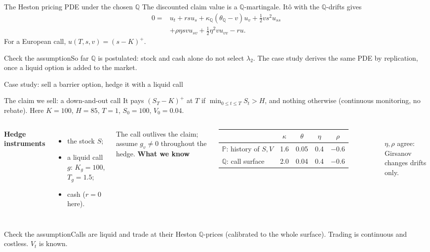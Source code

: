 \documentclass[handout,10pt,t,aspectratio=169]{beamer}
\newenvironment{watchbox}{\begin{alertblock}{Check the assumption}}{\end{alertblock}}
\newcommand{\Q}{\mathbb Q}
\newcommand{\Pp}{\mathbb P}
\begin{document}
\begin{frame}{The Heston pricing PDE under the chosen \(\Q\)}
\small
The discounted claim value is a \(\Q\)-martingale. It\^o with the \(\Q\)-drifts gives
\[\boxed{\begin{aligned}
0={}&u_t+rsu_s+\kappa_\Q(\theta_\Q-v)u_v+\tfrac12vs^2u_{ss}\\
   &+\rho\eta svu_{sv}+\tfrac12\eta^2vu_{vv}-ru.
\end{aligned}}\]
For a European call, \(u(T,s,v)=(s-K)^+\).
\begin{watchbox}So far \(\Q\) is postulated: stock and cash alone do not select \(\lambda_2\).
The case study derives the same PDE by replication, once a liquid option is added
to the market.\end{watchbox}
\end{frame}

\begin{frame}{Case study: sell a barrier option, hedge it with a liquid call}
\small
\begin{block}{The claim we sell: a down-and-out call}
It pays \((S_T-K)^+\) at \(T\) if \(\min_{0\le t\le T}S_t>H\), and nothing otherwise
(continuous monitoring, no rebate). Here \(K=100\), \(H=85\), \(T=1\), \(S_0=100\), \(V_0=0.04\).
\end{block}
\begin{columns}[T,onlytextwidth]
\textbf{Hedge instruments}
\begin{itemize}
\item the stock \(S\);
\item a liquid call \(g\): \(K_g=100\), \(T_g=1.5\);
\item cash (\(r=0\) here).
\end{itemize}
The call outlives the claim; assume \(g_v\ne0\) throughout the hedge.
\textbf{What we know}\\[.4em]
\begin{tabular}{lcccc}
\toprule & \(\kappa\) & \(\theta\) & \(\eta\) & \(\rho\)\\\midrule
\(\Pp\): history of \(S,V\) & 1.6 & 0.05 & 0.4 & \(-0.6\)\\
\(\Q\): call surface & 2.0 & 0.04 & 0.4 & \(-0.6\)\\\bottomrule
\end{tabular}\\[.4em]
\(\eta,\rho\) agree: Girsanov changes drifts only.
\end{columns}
\begin{watchbox}Calls are liquid and trade at their Heston \(\Q\)-prices (calibrated to the whole
surface). Trading is continuous and costless. \(V_t\) is known.\end{watchbox}
\end{frame}
\end{document}
